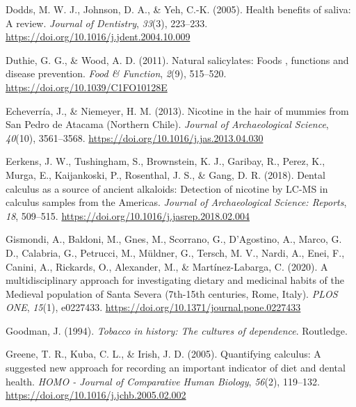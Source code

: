 \documentclass[
]{article}
\newlength{\cslhangindent}
\newlength{\cslentryspacingunit} %
\newenvironment{CSLReferences}[2] %
 {%
  \setlength{\parindent}{0pt}
  \ifodd #1
  \let\oldpar\par
  \def\par{\hangindent=\cslhangindent\oldpar}
  \fi
  \setlength{\parskip}{#2\cslentryspacingunit}
 }%
 {}
\begin{document}
\begin{CSLReferences}{1}{0}
\leavevmode{}%
Dodds, M. W. J., Johnson, D. A., \& Yeh, C.-K. (2005). Health benefits
of saliva: A review. \emph{Journal of Dentistry}, \emph{33}(3),
223--233. \url{https://doi.org/10.1016/j.jdent.2004.10.009}

\leavevmode{}%
Duthie, G. G., \& Wood, A. D. (2011). Natural salicylates: Foods ,
functions and disease prevention. \emph{Food \& Function}, \emph{2}(9),
515--520. \url{https://doi.org/10.1039/C1FO10128E}

\leavevmode{}%
Echeverría, J., \& Niemeyer, H. M. (2013). Nicotine in the hair of
mummies from {San Pedro} de {Atacama} ({Northern Chile}). \emph{Journal
of Archaeological Science}, \emph{40}(10), 3561--3568.
\url{https://doi.org/10.1016/j.jas.2013.04.030}

\leavevmode{}%
Eerkens, J. W., Tushingham, S., Brownstein, K. J., Garibay, R., Perez,
K., Murga, E., Kaijankoski, P., Rosenthal, J. S., \& Gang, D. R. (2018).
Dental calculus as a source of ancient alkaloids: {Detection} of
nicotine by {LC-MS} in calculus samples from the {Americas}.
\emph{Journal of Archaeological Science: Reports}, \emph{18}, 509--515.
\url{https://doi.org/10.1016/j.jasrep.2018.02.004}

\leavevmode{}%
Gismondi, A., Baldoni, M., Gnes, M., Scorrano, G., D'Agostino, A.,
Marco, G. D., Calabria, G., Petrucci, M., Müldner, G., Tersch, M. V.,
Nardi, A., Enei, F., Canini, A., Rickards, O., Alexander, M., \&
Martínez-Labarga, C. (2020). A multidisciplinary approach for
investigating dietary and medicinal habits of the {Medieval} population
of {Santa Severa} (7th-15th centuries, {Rome}, {Italy}). \emph{PLOS
ONE}, \emph{15}(1), e0227433.
\url{https://doi.org/10.1371/journal.pone.0227433}

\leavevmode{}%
Goodman, J. (1994). \emph{Tobacco in history: The cultures of
dependence}. {Routledge}.

\leavevmode{}%
Greene, T. R., Kuba, C. L., \& Irish, J. D. (2005). Quantifying
calculus: {A} suggested new approach for recording an important
indicator of diet and dental health. \emph{HOMO - Journal of Comparative
Human Biology}, \emph{56}(2), 119--132.
\url{https://doi.org/10.1016/j.jchb.2005.02.002}


\end{CSLReferences}
\end{document}
